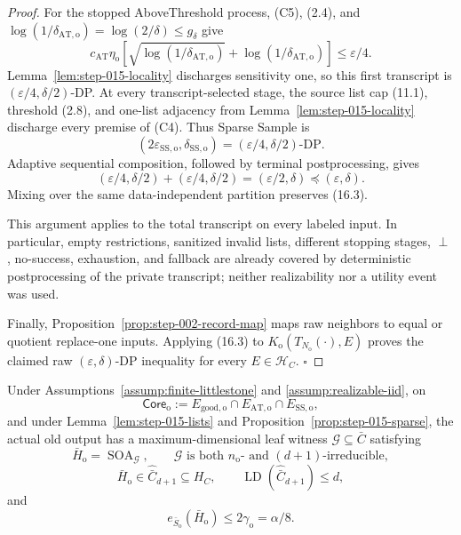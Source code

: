 \begin{proof}
For the stopped AboveThreshold process, (C5), (2.4), and
\(\log(1/\delta_{\mathrm{AT,o}})=\log(2/\delta)\le g_\delta\) give
\[
c_{\mathrm{AT}}\eta_{\mathrm o}
[\sqrt{\log(1/\delta_{\mathrm{AT,o}})}
+\log(1/\delta_{\mathrm{AT,o}})]
\le\varepsilon/4.
\tag{16.1}
\]
Lemma~\ref{lem:step-015-locality} discharges sensitivity one, so this first
transcript is \((\varepsilon/4,\delta/2)\)-DP. At every transcript-selected
stage, the source list cap (11.1), threshold (2.8), and one-list adjacency
from Lemma~\ref{lem:step-015-locality} discharge every premise of (C4).
Thus Sparse Sample is
\[
(2\varepsilon_{\mathrm{SS,o}},\delta_{\mathrm{SS,o}})
=(\varepsilon/4,\delta/2)\text{-DP}.
\tag{16.2}
\]
Adaptive sequential composition, followed by terminal postprocessing,
gives
\[
(\varepsilon/4,\delta/2)+(\varepsilon/4,\delta/2)
=(\varepsilon/2,\delta)\preceq(\varepsilon,\delta).
\tag{16.3}
\]
Mixing over the same data-independent partition preserves (16.3).

This argument applies to the total transcript on every labeled input.
In particular, empty restrictions, sanitized invalid lists, different
stopping stages, \(\perp\), no-success, exhaustion, and fallback are
already covered by deterministic postprocessing of the private transcript;
neither realizability nor a utility event was used.

Finally, Proposition~\ref{prop:step-002-record-map} maps raw
neighbors to equal or quotient replace-one inputs. Applying (16.3) to
\(K_{\mathrm o}(T_{N_{\mathrm o}}(\cdot),E)\) proves the claimed raw
\((\varepsilon,\delta)\)-DP inequality for every
\(E\in\mathcal H_C\). \(\square\)


\end{proof}

\begin{proposition}\label{prop:step-015-soa}
Under Assumptions~\ref{assump:finite-littlestone} and
\ref{assump:realizable-iid}, on
\[
\mathsf{Core}_{\mathrm o}:=
E_{\mathrm{good,o}}\cap E_{\mathrm{AT,o}}\cap E_{\mathrm{SS,o}},
\tag{17.1}
\]
and under Lemma~\ref{lem:step-015-lists} and
Proposition~\ref{prop:step-015-sparse}, the actual old output has a
maximum-dimensional leaf witness \(\mathcal G\subseteq\bar C\) satisfying
\[
\bar H_{\mathrm o}=\operatorname{SOA}_{\mathcal G},\qquad
\mathcal G\text{ is both }n_{\mathrm o}\text{- and }
(d+1)\text{-irreducible},
\tag{17.2}
\]
\[
\bar H_{\mathrm o}\in\widehat{\bar C}_{d+1}\subseteq H_C,\qquad
\operatorname{LD}(\widehat{\bar C}_{d+1})\le d,
\tag{17.3}
\]
and
\[
e_{\bar S_{\mathrm o}}(\bar H_{\mathrm o})
\le2\gamma_{\mathrm o}=\alpha/8.
\tag{17.4}
\]


\end{proposition}

